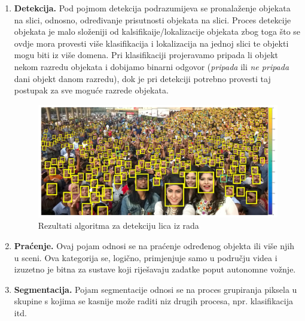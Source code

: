 \begin{enumerate}
\item \textbf{Detekcija.} Pod pojmom detekcija podrazumijeva se pronalaženje objekata na slici, odnosno, određivanje prisutnosti objekata na slici. Proces detekcije objekata je malo složeniji od kalsifikaije/lokalizacije objekata zbog toga što se ovdje mora provesti više klasifikacija i lokalizacija na jednoj slici te objekti mogu biti iz više domena. Pri klasifikaciji projeravamo pripada li objekt nekom razredu objekata i dobijamo binarni odgovor (\textit{pripada} ili \textit{ne pripada} dani objekt danom razredu), dok je pri detekciji potrebno provesti taj postupak za sve moguće razrede objekata.
\begin{figure}[htb]
\centering
\includegraphics[width=\linewidth]{img/FindingTinyFaces.png}
\caption{Rezultati algoritma za detekciju lica iz rada \citep{findingTinyFaces}}
\label{img:findingTinyFaces}
\end{figure}

\item \textbf{Praćenje.} Ovaj pojam odnosi se na praćenje određenog objekta ili više njih u sceni. Ova kategorija se, logično, primjenjuje samo u području videa i izuzetno je bitna za sustave koji riješavaju zadatke poput autonomne vožnje.

\item \textbf{Segmentacija.} Pojam segmentacije odnosi se na proces grupiranja piksela u skupine s kojima se kasnije može raditi niz drugih procesa, npr. klasifikacija itd. 


\end{enumerate}
